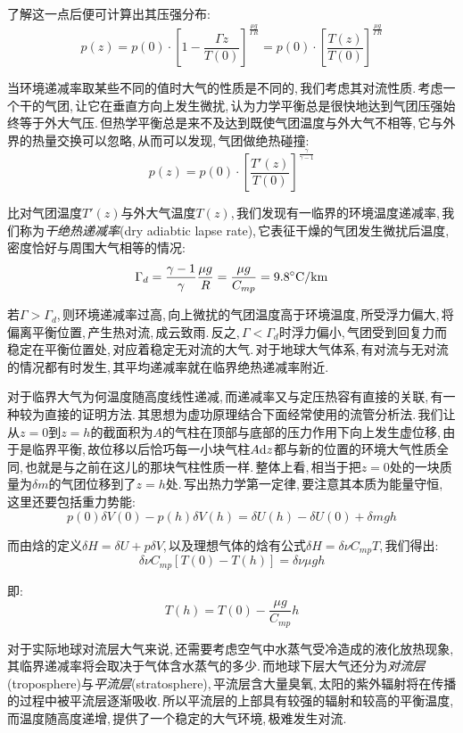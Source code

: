 了解这一点后便可计算出其压强分布:
\[p(z)=p(0)\cdot[1-\frac{\Gamma z}{T(0)}]^\frac{\mu g}{\Gamma R}=p(0)\cdot[\frac{T(z)}{T(0)}]^\frac{\mu g}{\Gamma R}\]

当环境递减率取某些不同的值时大气的性质是不同的,\,我们考虑其对流性质.\,考虑一个干的气团,\,让它在垂直方向上发生微扰,\,认为力学平衡总是很快地达到\ca 气团压强始终等于外大气压.\,但热学平衡总是来不及达到\ca 既使气团温度与外大气不相等,\,它与外界的热量交换可以忽略,\,从而可以发现,\,气团做绝热碰撞:
\[p(z)=p(0)\cdot[\frac{T'(z)}{T(0)}]^\frac{\gamma}{\gamma -1}\]

比对气团温度$T'(z)$与外大气温度$T(z)$,\,我们发现有一临界的环境温度递减率,\,我们称为\emph{干绝热递减率}(dry adiabtic lapse rate),\,它表征干燥的气团发生微扰后温度,\,密度恰好与周围大气相等的情况:
\[\Gamma_d=\frac{\gamma-1}{\gamma}\frac{\mu g}{R}=\frac{\mu g}{C_{mp}}=9.8^\circ \mathrm{C}/\mathrm{km}\]

若$\Gamma>\Gamma_d$,\,则环境递减率过高,\,向上微扰的气团温度高于环境温度,\,所受浮力偏大,\,将偏离平衡位置,\,产生热对流,\,成云致雨.\,反之,\,$\Gamma<\Gamma_d$时浮力偏小,\,气团受到回复力而稳定在平衡位置处,\,对应着稳定无对流的大气.\,对于地球大气体系,\,有对流与无对流的情况都有时发生,\,其平均递减率就在临界绝热递减率附近.

对于临界大气为何温度随高度线性递减,\,而递减率又与定压热容有直接的关联,\,有一种较为直接的证明方法.\,其思想为虚功原理结合下面经常使用的流管分析法.\,我们让从$z=0$到$z=h$的截面积为$A$的气柱在顶部与底部的压力作用下向上发生虚位移,\,由于是临界平衡,\,故位移以后恰巧每一小块气柱$A\textrm{d} z$都与新的位置的环境大气性质全同,\,也就是与之前在这儿的那块气柱性质一样.\,整体上看,\,相当于把$z=0$处的一块质量为$\delta m$的气团位移到了$z=h$处.\,写出热力学第一定律,\,要注意其本质为能量守恒,\,这里还要包括重力势能:
\[p(0)\delta V(0)-p(h)\delta V(h)=\delta U(h)-\delta U(0)+\delta m gh\]

而由焓的定义$\delta H=\delta U +p\delta V$,\,以及理想气体的焓有公式$\delta H=\delta \nu C_{mp}T$,\,我们得出:
\[\delta \nu C_{mp}[T(0)-T(h)]=\delta \nu \mu gh\]

即:
\[T(h)=T(0)-\frac{\mu g}{C_{mp}}h\]

对于实际地球对流层大气来说,\,还需要考虑空气中水蒸气受冷造成的液化放热现象,\,其临界递减率将会取决于气体含水蒸气的多少.\,而地球下层大气还分为\emph{对流层}(troposphere)与\emph{平流层}(stratosphere),\,平流层含大量臭氧,\,太阳的紫外辐射将在传播的过程中被平流层逐渐吸收.\,所以平流层的上部具有较强的辐射和较高的平衡温度,\,而温度随高度递增,\,提供了一个稳定的大气环境,\,极难发生对流.





